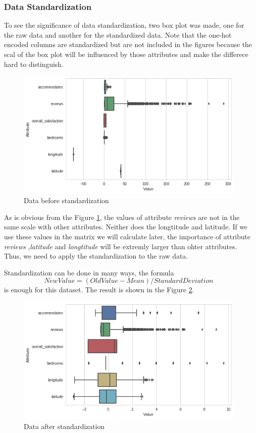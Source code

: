 \documentclass[12pt]{article}
\begin{document}
\subsubsection{Data Standardization}
To see the significance of data standardization, two box plot was made, one for the raw data and another for the standardized data. Note that the one-hot encoded columns are standardized but are not included in the figures because the scal of the box plot will be influenced by those attributes and make the differece hard to distinguish.\\
\begin{figure}[htbp]
\centering
\includegraphics[width = \textwidth]{images/before-std.png}
\caption{Data before standardization}
\label{fig:before-std}
\end{figure}
As is obvious from the Figure \ref{fig:before-std}, the values of attribute \textit{reviews} are not in the same scale with other attributes. Neither does the longtitude and latitude. If we use these values in the matrix we will calculate later, the importance of attribute \textit{reviews} ,\textit{latitude} and \textit{longtitude} will be extremly larger than ohter attributes. Thus, we need to apply the standardization to the raw data.

\par Standardization can be done in many ways, the formula
\[NewValue = (OldValue-Mean)/StandardDeviation\]
is enough for this dataset. The result is shown in the Figure \ref{fig:after-std}.
\begin{figure}[htbp]
\centering
\includegraphics[width = \textwidth]{images/after-std.png}
\caption{Data after standardization}
\label{fig:after-std}
\end{figure}
\end{document}
